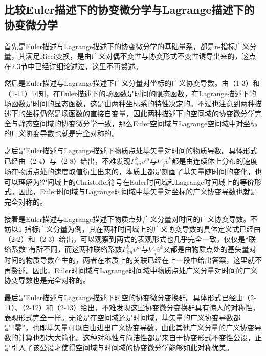 \documentclass[UTF8]{ctexart}
\begin{document}
\subsection{比较Euler描述下的协变微分学与Lagrange描述下的协变微分学}
首先是Euler描述与Lagrange描述下的协变微分学的基础量系，都是n-指标广义分量，其满足Ricci变换，是由广义对偶不变性与协变形式不变性诱导出来的，这点在2.3节中已经详细论述过，这里不再赘述。\par
然后是Euler描述与Lagrange描述下广义分量对坐标的广义协变导数。由（1-3）和（1-11）可知，在Euler描述下的场函数是时间的隐态函数，在Lagrange描述下的场函数是时间的显态函数，这是由两种坐标系的特性决定的。不过也注意到两种描述下的坐标仍然是场函数的直接自变量，因此两种描述下的空间域的协变微分学完全与静态空间域的协变微分学一致，那么Euler空间域与Lagrange空间域中对坐标的广义协变导数也就是完全对称的。\par
之后是Euler描述与Lagrange描述下物质点处基矢量对时间的物质导数。具体形式已经由（2-4）与（2-8）给出，不难发现$\Gamma_{im}^{k} v^m$与$\nabla_{\hat{i}} {\hat{v}}^k$都是由连续体上分布的速度场在物质点处的速度取值衍生出来的，本质上都是刻画了基矢量随时间的变化，也可以理解为空间域上的Christoffel符号在Euler时间域和Lagrange时间域上的等价形式。因此，Euler时间域与Lagrange时间域中基矢量对坐标的广义协变导数也就是完全对称的。\par
接着是Euler描述与Lagrange描述下物质点处广义分量对时间的广义协变导数。不妨以1-指标广义分量为例，其在两种时间域上的广义协变导数的具体定义式已经由（2-2）和（2-3）给出，可以观察到两式的表观形式也几乎完全一致，仅仅是“联络系数”有所不同，而这两种联络系数$\Gamma_{im}^{k} v^m$与$\nabla_{\hat{i}} {\hat{v}}^k$又都是由物质点处的基矢量对时间的物质导数产生的，两者在本质上的关联已经在上一段中给出答案，这里就不再赘述。因此，Euler时间域与Lagrange时间域中物质点处广义分量对时间的广义协变导数也是完全对称的。\par
最后是Euler描述与Lagrange描述下时空的协变微分变换群。具体形式已经由（2-11）、（2-12）和（2-13）给出，不难发现这些协变微分变换群具有惊人的对称性，表观形式完全一样。无论是在空间域还是时间域，基矢量的广义协变导数都是“零”，也即基矢量可以自由进出广义协变导数，由此其他广义分量的广义协变导数的计算也都大大简化。这种对称性与简洁性都是来自于协变形式不变性公设，正是引入了该公设才使得空间域与时间域的协变微分学能够如此对称优美。
\end{document}
